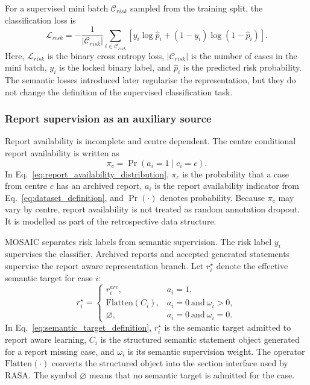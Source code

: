 For a supervised mini batch $\mathcal{C}_{risk}$ sampled from the training split, the classification loss is
\begin{equation}
\mathcal{L}_{risk}
=
-\frac{1}{|\mathcal{C}_{risk}|}
\sum_{i\in\mathcal{C}_{risk}}
\left[y_i\log\hat{p}_i+(1-y_i)\log(1-\hat{p}_i)\right].
\label{eq:classification_objective}
\end{equation}
Here, $\mathcal{L}_{risk}$ is the binary cross entropy loss, $|\mathcal{C}_{risk}|$ is the number of cases in the mini batch, $y_i$ is the locked binary label, and $\hat{p}_i$ is the predicted risk probability. The semantic losses introduced later regularise the representation, but they do not change the definition of the supervised classification task.

\subsubsection{Report supervision as an auxiliary source}
\label{subsubsec:report_supervision_auxiliary_source}

Report availability is incomplete and centre dependent. The centre conditional report availability is written as
\begin{equation}
\pi_c=\Pr(a_i=1\mid c_i=c).
\label{eq:report_availability_distribution}
\end{equation}
In Eq.~\eqref{eq:report_availability_distribution}, $\pi_c$ is the probability that a case from centre $c$ has an archived report, $a_i$ is the report availability indicator from Eq.~\eqref{eq:dataset_definition}, and $\Pr(\cdot)$ denotes probability. Because $\pi_c$ may vary by centre, report availability is not treated as random annotation dropout. It is modelled as part of the retrospective data structure.

MOSAIC separates risk labels from semantic supervision. The risk label $y_i$ supervises the classifier. Archived reports and accepted generated statements supervise the report aware representation branch. Let $r_i^{\star}$ denote the effective semantic target for case $i$:
\begin{equation}
r_i^{\star}
=
\begin{cases}
r_i^{arc}, & a_i=1,\\
\mathrm{Flatten}(C_i), & a_i=0\ \mathrm{and}\ \omega_i>0,\\
\varnothing, & a_i=0\ \mathrm{and}\ \omega_i=0.
\end{cases}
\label{eq:semantic_target_definition}
\end{equation}
In Eq.~\eqref{eq:semantic_target_definition}, $r_i^{\star}$ is the semantic target admitted to report aware learning, $C_i$ is the structured semantic statement object generated for a report missing case, and $\omega_i$ is its semantic supervision weight. The operator $\mathrm{Flatten}(\cdot)$ converts the structured object into the section interface used by RASA. The symbol $\varnothing$ means that no semantic target is admitted for the case.

